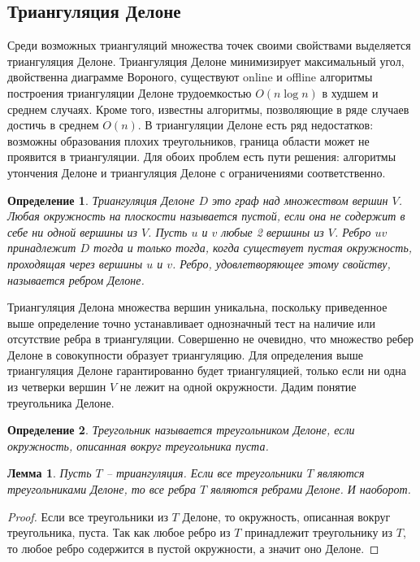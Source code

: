 \documentclass{fefu}
\newtheorem{definition}{Определение}
\newtheorem{lemma}{Лемма}
\begin{document}
\subsection{Триангуляция Делоне}
Среди возможных триангуляций множества точек своими свойствами выделяется триангуляция Делоне. Триангуляция Делоне
минимизирует максимальный угол, двойственна диаграмме Вороного, существуют online и offline алгоритмы построения
триангуляции Делоне трудоемкостью $O(n\log{}n)$ в худшем и среднем случаях. Кроме того, известны алгоритмы, позволяющие
в ряде случаев достичь в среднем $O(n)$. В триангуляции Делоне есть ряд недостатков: возможны образования плохих
треугольников, граница области может не проявится в триангуляции. Для обоих проблем есть пути решения: алгоритмы
утончения Делоне \cite{DelaunayRefinement} и триангуляция Делоне с ограничениями соответственно.
\begin{definition}
    \textit{Триангуляция Делоне} $D$ это граф над множеством вершин $V$. Любая окружность на плоскости
    называется \textit{пустой}, если она не содержит в себе ни одной вершины из $V$. Пусть $u$ и $v$ любые 2 вершины из
    $V$. Ребро $uv$ принадлежит $D$ тогда и только тогда, когда существует пустая окружность, проходящая через вершины
    $u$ и $v$. Ребро, удовлетворяющее этому свойству, называется ребром Делоне.
\end{definition}
Триангуляция Делона множества вершин уникальна, поскольку приведенное выше определение точно устанавливает однозначный
тест на наличие или отсутствие ребра в триангуляции.
Совершенно не очевидно, что множество ребер Делоне в совокупности образует триангуляцию. Для определения
выше триангуляция Делоне гарантированно будет триангуляцией, только если ни одна из четверки вершин $V$ не лежит на одной
окружности. Дадим понятие треугольника Делоне.
\begin{definition}
    Треугольник называется треугольником Делоне, если окружность, описанная вокруг треугольника пуста.
\end{definition}
\begin{lemma}
    Пусть $T$ -- триангуляция. Если все треугольники $T$ являются треугольниками Делоне, то все ребра $T$ являются 
    ребрами Делоне. И наоборот.
\end{lemma}
\begin{proof}
    Если все треугольники из $T$ Делоне, то окружность, описанная вокруг треугольника, пуста. Так как любое ребро
    из $T$ принадлежит треугольнику из $T$, то любое ребро содержится в пустой окружности, а значит оно Делоне.
\end{proof}
\end{document}
